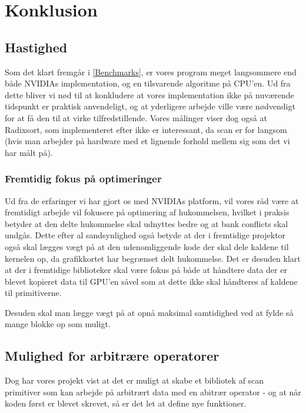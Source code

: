 

\section{Konklusion}

\subsection{Hastighed}
Som det klart fremgår i \ref{Benchmarks}, er vores program meget langsommere end både NVIDIAs implementation, og en tilsvarende algoritme på CPU'en. Ud fra dette bliver vi nød til at konkludere at vores implementation ikke på nuværende tidspunkt er praktisk anvendeligt, og at yderligere arbejde ville være nødvendigt for at få den til at virke tilfredstillende. Vores målinger viser dog også at Radixsort, som implementeret efter \cite{ble} ikke er interessant, da scan er for langsom (hvis man arbejder på hardware med et lignende forhold mellem sig som det vi
har målt på).

\subsubsection{Fremtidig fokus på optimeringer}
Ud fra de erfaringer vi har gjort os med NVIDIAs platform, vil vores råd være at fremtidigt arbejde vil fokusere på optimering af hukommelsen, hvilket i praksis betyder at den delte hukommelse skal udnyttes bedre og at bank conflicts skal undgås. Dette efter al sandsynlighed også betyde at der i fremtidige projektor også skal lægges vægt på at den udenomliggende kode der skal dele kaldene til kernelen op, da grafikkortet har begrænset delt hukommelse. Det er desuden klart at der i fremtidige biblioteker skal være fokus på både at håndtere data der er blevet kopieret data til GPU'en såvel som at dette ikke skal håndteres af kaldene til primitiverne.

Desuden skal man lægge vægt på at opnå maksimal samtidighed ved at fylde så mange blokke op som muligt.

\subsection{Mulighed for arbitrære operatorer}
Dog har vores projekt vist at det er muligt at skabe et bibliotek af scan primitiver som kan arbejde på arbitrært data med en abitrær operator - og at når koden først er blevet skrevet, så er det let at define nye funktioner. 
